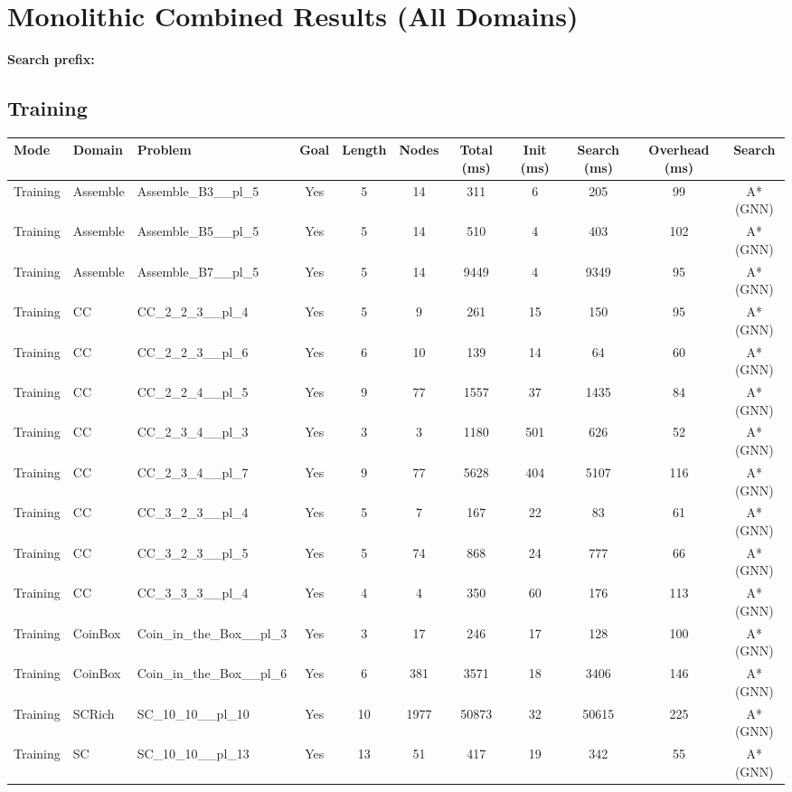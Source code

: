 \documentclass{article}
\begin{document}
\section*{Monolithic Combined Results (All Domains)}
\textbf{Search prefix:} 
\\[0.5cm]
\subsection*{Training}
\begin{tabular}{lllcccccccc}
\toprule
Mode & Domain & Problem & Goal & Length & Nodes & Total (ms) & Init (ms) & Search (ms) & Overhead (ms) & Search \\
\midrule
Training & Assemble & Assemble\_B3\_\_pl\_5 & Yes & 5 & 14 & 311 & 6 & 205 & 99 & A*(GNN) \\
Training & Assemble & Assemble\_B5\_\_pl\_5 & Yes & 5 & 14 & 510 & 4 & 403 & 102 & A*(GNN) \\
Training & Assemble & Assemble\_B7\_\_pl\_5 & Yes & 5 & 14 & 9449 & 4 & 9349 & 95 & A*(GNN) \\
Training & CC & CC\_2\_2\_3\_\_pl\_4 & Yes & 5 & 9 & 261 & 15 & 150 & 95 & A*(GNN) \\
Training & CC & CC\_2\_2\_3\_\_pl\_6 & Yes & 6 & 10 & 139 & 14 & 64 & 60 & A*(GNN) \\
Training & CC & CC\_2\_2\_4\_\_pl\_5 & Yes & 9 & 77 & 1557 & 37 & 1435 & 84 & A*(GNN) \\
Training & CC & CC\_2\_3\_4\_\_pl\_3 & Yes & 3 & 3 & 1180 & 501 & 626 & 52 & A*(GNN) \\
Training & CC & CC\_2\_3\_4\_\_pl\_7 & Yes & 9 & 77 & 5628 & 404 & 5107 & 116 & A*(GNN) \\
Training & CC & CC\_3\_2\_3\_\_pl\_4 & Yes & 5 & 7 & 167 & 22 & 83 & 61 & A*(GNN) \\
Training & CC & CC\_3\_2\_3\_\_pl\_5 & Yes & 5 & 74 & 868 & 24 & 777 & 66 & A*(GNN) \\
Training & CC & CC\_3\_3\_3\_\_pl\_4 & Yes & 4 & 4 & 350 & 60 & 176 & 113 & A*(GNN) \\
Training & CoinBox & Coin\_in\_the\_Box\_\_pl\_3 & Yes & 3 & 17 & 246 & 17 & 128 & 100 & A*(GNN) \\
Training & CoinBox & Coin\_in\_the\_Box\_\_pl\_6 & Yes & 6 & 381 & 3571 & 18 & 3406 & 146 & A*(GNN) \\
Training & SCRich & SC\_10\_10\_\_pl\_10 & Yes & 10 & 1977 & 50873 & 32 & 50615 & 225 & A*(GNN) \\
Training & SC & SC\_10\_10\_\_pl\_13 & Yes & 13 & 51 & 417 & 19 & 342 & 55 & A*(GNN) \\

\end{tabular}
\end{document}
